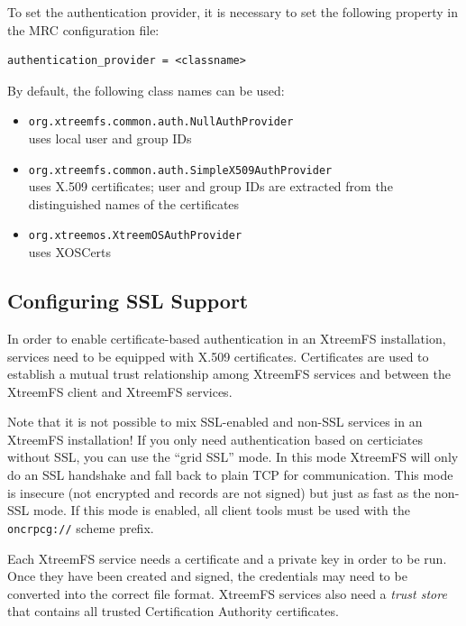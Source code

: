 \documentclass[a4paper,10pt]{book}
\begin{document}
To set the authentication provider, it is necessary to set the following property in the MRC configuration file:

\begin{verbatim}
authentication_provider = <classname>
\end{verbatim}

By default, the following class names can be used:

\begin{itemize}
 \item \texttt{org.xtreemfs.common.auth.NullAuthProvider}\\
uses local user and group IDs
 \item \texttt{org.xtreemfs.common.auth.SimpleX509AuthProvider}\\
uses X.509 certificates; user and group IDs are extracted from the distinguished names of the certificates
 \item \texttt{org.xtreemos.XtreemOSAuthProvider}\\
uses XOSCerts
\end{itemize}


\subsection{Configuring SSL Support}
\label{sec:cfg_ssl}

In order to enable certificate-based authentication in an XtreemFS installation, services need to be equipped with X.509 certificates. Certificates are used to establish a mutual trust relationship among XtreemFS services and between the XtreemFS client and XtreemFS services.

Note that it is not possible to mix SSL-enabled and non-SSL services in an XtreemFS installation! If you only need authentication based on certiciates without SSL, you can use the ``grid SSL'' mode. In this mode XtreemFS will only do an SSL handshake and fall back to plain TCP for communication. This mode is insecure (not encrypted and records are not signed) but just as fast as the non-SSL mode. If this mode is enabled, all client tools must be used with the \texttt{oncrpcg://} scheme prefix.

Each XtreemFS service needs a certificate and a private key in order to be run. Once they have been created and signed, the credentials may need to be converted into the correct file format. XtreemFS services also need a \textit{trust store} that contains all trusted Certification Authority certificates.
\end{document}
